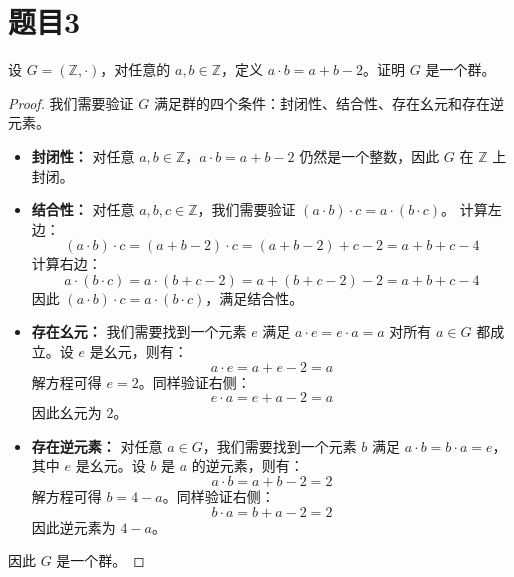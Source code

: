 \documentclass[utf8]{ctexart}
\theoremstyle{mystyle}
\begin{document}
\section*{题目3}
\begin{problembox}
  设 $G=(\mathbb{Z}, \cdot)$，对任意的 $a, b \in \mathbb{Z}$，定义 $a \cdot b = a + b - 2$。证明 $G$ 是一个群。
\end{problembox}
\begin{proof}
我们需要验证 $G$ 满足群的四个条件：封闭性、结合性、存在幺元和存在逆元素。
\begin{itemize}
  \item \textbf{封闭性：} 对任意 $a, b \in \mathbb{Z}$，$a \cdot b = a + b - 2$ 仍然是一个整数，因此 $G$ 在 $\mathbb{Z}$ 上封闭。
  
  \item \textbf{结合性：} 对任意 $a, b, c \in \mathbb{Z}$，我们需要验证 $(a \cdot b) \cdot c = a \cdot (b \cdot c)$。
  计算左边：
  \[
  (a \cdot b) \cdot c = (a + b - 2) \cdot c = (a + b - 2) + c - 2 = a + b + c - 4
  \]
  计算右边：
  \[
  a \cdot (b \cdot c) = a \cdot (b + c - 2) = a + (b + c - 2) - 2 = a + b + c - 4
  \]
  因此 $(a \cdot b) \cdot c = a \cdot (b \cdot c)$，满足结合性。
  
  \item \textbf{存在幺元：} 我们需要找到一个元素 $e$ 满足 $a \cdot e = e \cdot a = a$ 对所有 $a \in G$ 都成立。设 $e$ 是幺元，则有：
  \[
  a \cdot e = a + e - 2 = a
  \]
  解方程可得 $e = 2$。同样验证右侧：
  \[
  e \cdot a = e + a - 2 = a
  \]
  因此幺元为 $2$。
  
  \item \textbf{存在逆元素：} 对任意 $a \in G$，我们需要找到一个元素 $b$ 满足 $a \cdot b = b \cdot a = e$，其中 $e$ 是幺元。设 $b$ 是 $a$ 的逆元素，则有：
  \[
  a \cdot b = a + b - 2 = 2
  \]
  解方程可得 $b = 4 - a$。同样验证右侧：
  \[
  b \cdot a = b + a - 2 = 2
  \]
  因此逆元素为 $4 - a$。
\end{itemize}
因此 $G$ 是一个群。
\end{proof}
\end{document}
